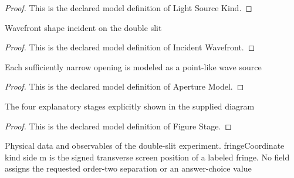 \begin{proof}
  This is the declared model definition of Light Source Kind.
\end{proof}
\begin{definition}
  \label{def:physics:phyx-mini-0248:phyxminiproblems-problemphyxmini0248-incidentwavefront}
  Wavefront shape incident on the double slit
\end{definition}
\begin{proof}
  This is the declared model definition of Incident Wavefront.
\end{proof}
\begin{definition}
  \label{def:physics:phyx-mini-0248:phyxminiproblems-problemphyxmini0248-aperturemodel}
  Each sufficiently narrow opening is modeled as a point-like wave source
\end{definition}
\begin{proof}
  This is the declared model definition of Aperture Model.
\end{proof}
\begin{definition}
  \label{def:physics:phyx-mini-0248:phyxminiproblems-problemphyxmini0248-figurestage}
  The four explanatory stages explicitly shown in the supplied diagram
\end{definition}
\begin{proof}
  This is the declared model definition of Figure Stage.
\end{proof}
\begin{definition}
  \label{def:physics:phyx-mini-0248:phyxminiproblems-problemphyxmini0248-doubleslitinterferencesetup}
  Physical data and observables of the double-slit experiment. fringeCoordinate kind side m is the signed transverse screen position of a labeled fringe. No field assigns the requested order-two separation or an answer-choice value
\end{definition}
